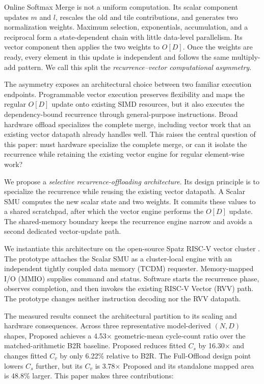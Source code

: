 \documentclass[journal]{IEEEtran}
\newcommand{\btor}{\mbox{B2R}}
\begin{document}
Online Softmax Merge is not a uniform computation. Its scalar component
updates $m$ and $l$, rescales the old and tile contributions, and generates two
normalization weights. Maximum selection, exponentials, accumulation, and a
reciprocal form a state-dependent chain with little data-level parallelism. Its
vector component then applies the two weights to $O[D]$. Once the weights are
ready, every element in this update is independent and follows the same
multiply-add pattern. We call this split the \emph{recurrence--vector
computational asymmetry}.

The asymmetry exposes an architectural choice between two familiar execution
endpoints. Programmable vector execution preserves flexibility and maps the
regular $O[D]$ update onto existing SIMD resources, but it also executes the
dependency-bound recurrence through general-purpose instructions. Broad
hardware offload specializes the complete merge, including vector work that an
existing vector datapath already handles well. This raises the central
question of this paper: must hardware specialize the complete merge, or can it
isolate the recurrence while retaining the existing vector engine for regular
element-wise work?

We propose a \emph{selective recurrence-offloading architecture}. Its design
principle is to specialize the recurrence while reusing the existing vector
datapath. A Scalar SMU computes the new scalar state and two weights. It commits
these values to a shared scratchpad, after which the vector engine performs the
$O[D]$ update. The shared-memory boundary keeps the recurrence engine narrow
and avoids a second dedicated vector-update path.

We instantiate this architecture on the open-source Spatz RISC-V vector
cluster \cite{spatz2023}. The prototype attaches the Scalar SMU as a
cluster-local engine with an independent tightly coupled data memory (TCDM)
requester. Memory-mapped I/O (MMIO) supplies command and status. Software
starts the recurrence phase, observes completion, and then invokes the
existing RISC-V Vector (RVV) path. The prototype changes neither instruction
decoding nor the RVV datapath.

The measured results connect the architectural partition to its scaling and
hardware consequences. Across three representative model-derived $(N,D)$
shapes, Proposed achieves a 4.53$\times$ geometric-mean cycle-count ratio over
the matched-arithmetic \btor{} baseline. Proposed reduces fitted $C_s$ by
16.30$\times$ and changes fitted $C_v$ by only 6.22\% relative to \btor{}.
The Full-Offload design point lowers $C_s$ further, but its $C_v$ is
3.78$\times$ Proposed and its standalone mapped area is 48.8\% larger. This
paper makes three contributions:
\end{document}

